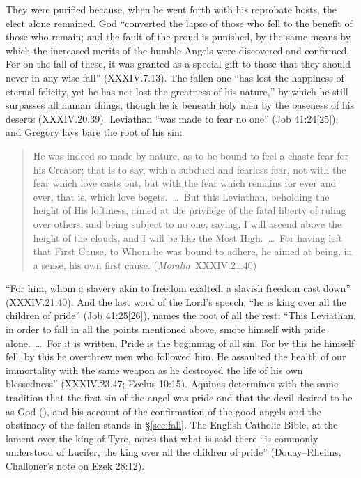 \noindent They were purified because, when he went forth with his reprobate
hosts, the elect alone remained. God ``converted the lapse of those who fell
to the benefit of those who remain; and the fault of the proud is punished,
by the same means by which the increased merits of the humble Angels were
discovered and confirmed. For on the fall of these, it was granted as a
special gift to those that they should never in any wise fall''
(XXXIV.7.13). The fallen one ``has lost the happiness of eternal felicity,
yet he has not lost the greatness of his nature,'' by which he still
surpasses all human things, though he is beneath holy men by the baseness of
his deserts (XXXIV.20.39). Leviathan ``was made to fear no one'' (Job
41:24[25]), and Gregory lays bare the root of his sin:

\begin{quote}
He was indeed so made by nature, as to be bound to feel a chaste fear for his
Creator; that is to say, with a subdued and fearless fear, not with the fear
which love casts out, but with the fear which remains for ever and ever, that
is, which love begets.~\dots\ But this Leviathan, beholding the height of His
loftiness, aimed at the privilege of the fatal liberty of ruling over others,
and being subject to no one, saying, I will ascend above the height of the
clouds, and I will be like the Most High.~\dots\ For having left that First
Cause, to Whom he was bound to adhere, he aimed at being, in a sense, his own
first cause. (\emph{Moralia}~XXXIV.21.40)
\end{quote}

\noindent ``For him, whom a slavery akin to freedom exalted, a slavish freedom
cast down'' (XXXIV.21.40). And the last word of the Lord's speech, ``he is
king over all the children of pride'' (Job 41:25[26]), names the root of all
the rest: ``This Leviathan, in order to fall in all the points mentioned
above, smote himself with pride alone.~\dots\ For it is written, Pride is the
beginning of all sin. For by this he himself fell, by this he overthrew men
who followed him. He assaulted the health of our immortality with the same
weapon as he destroyed the life of his own blessedness'' (XXXIV.23.47;
Ecclus 10:15). Aquinas determines with the same tradition that the first sin
of the angel was pride and that the devil desired to be as God (), and his
account of the confirmation of the good angels and the obstinacy of the
fallen stands in \S\ref{sec:fall}. The English Catholic Bible, at the lament
over the king of Tyre, notes that what is said there ``is commonly understood
of Lucifer, the king over all the children of pride'' (Douay--Rheims,
Challoner's note on Ezek 28:12).

